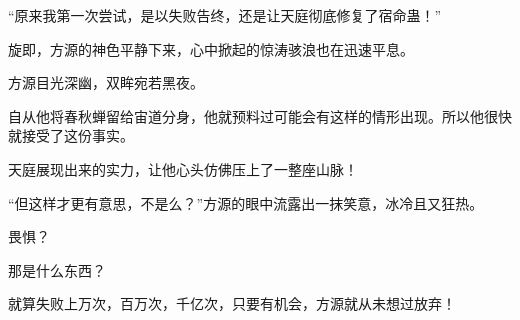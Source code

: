 \begin{this_body}
“原来我第一次尝试，是以失败告终，还是让天庭彻底修复了宿命蛊！”

旋即，方源的神色平静下来，心中掀起的惊涛骇浪也在迅速平息。

方源目光深幽，双眸宛若黑夜。

自从他将春秋蝉留给宙道分身，他就预料过可能会有这样的情形出现。所以他很快就接受了这份事实。

天庭展现出来的实力，让他心头仿佛压上了一整座山脉！

“但这样才更有意思，不是么？”方源的眼中流露出一抹笑意，冰冷且又狂热。

畏惧？

那是什么东西？

就算失败上万次，百万次，千亿次，只要有机会，方源就从未想过放弃！

\end{this_body}

